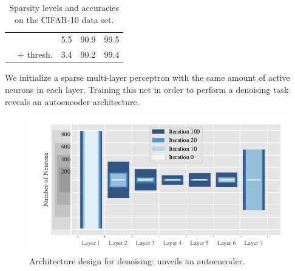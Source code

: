\begin{minipage}[t]{\textwidth}
\begin{minipage}[b][\bottomstripheight][b]{.48\textwidth}
\begin{table}[htb]
\begin{minipage}{.69\textwidth}
\begin{tabularx}{\textwidth}{|c||c c|R R|}
\hhline{-----}
                &\LinBreg{} &5.5&90.9&99.5\\
                &\LinBreg{} + thresh.&3.4&90.2&99.4\\
\end{tabularx}
\end{minipage}%
\begin{minipage}{.01\textwidth}%
\phantom{2}
\end{minipage}%
%
\begin{minipage}{.3\textwidth}%
\caption{Sparsity levels and accuracies on the CIFAR-10 data set.}\label{tab:CIFAR}
\end{minipage}
\end{table}
%
%
%
%
%
%
\vfill%
\vphantom{.}
\end{minipage}%
%
\hfill%
%
%
%
\hfill%
%
%
%
%
%
%
%
\noindent\begin{minipage}[b][\bottomstripheight][b]{.48\textwidth}%
%
%
\small%
We initialize a sparse multi-layer perceptron with the same amount of active neurons in each layer. Training this net in order to perform a denoising task reveals an autoencoder architecture. 

\begin{figure}%
\begin{minipage}{.3\textwidth}%
\caption{Architecture design for denoising: \LinBreg{} unveils an autoencoder.}
\end{minipage}%
\begin{minipage}{.7\textwidth}%
\includegraphics[width=\textwidth]{atelier/Encoder_3.pdf}
\end{minipage}%
\end{figure}
%
%
%


\vfill%
\vphantom{.}
\end{minipage}%
\end{minipage}%
%

